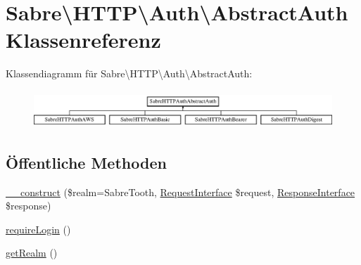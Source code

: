 \hypertarget{class_sabre_1_1_h_t_t_p_1_1_auth_1_1_abstract_auth}{}\section{Sabre\textbackslash{}H\+T\+TP\textbackslash{}Auth\textbackslash{}Abstract\+Auth Klassenreferenz}
\label{class_sabre_1_1_h_t_t_p_1_1_auth_1_1_abstract_auth}
Klassendiagramm für Sabre\textbackslash{}H\+T\+TP\textbackslash{}Auth\textbackslash{}Abstract\+Auth\+:\begin{figure}[H]
\begin{center}
\leavevmode
\includegraphics[height=1.428571cm]{class_sabre_1_1_h_t_t_p_1_1_auth_1_1_abstract_auth}
\end{center}
\end{figure}
\subsection*{Öffentliche Methoden}
\begin{DoxyCompactItemize}
\item 
\mbox{\hyperlink{class_sabre_1_1_h_t_t_p_1_1_auth_1_1_abstract_auth_a3e57c1181e92b05fb4061b17e00b19ad}{\+\_\+\+\_\+construct}} (\$realm=\textquotesingle{}Sabre\+Tooth\textquotesingle{}, \mbox{\hyperlink{interface_sabre_1_1_h_t_t_p_1_1_request_interface}{Request\+Interface}} \$request, \mbox{\hyperlink{interface_sabre_1_1_h_t_t_p_1_1_response_interface}{Response\+Interface}} \$response)
\item 
\mbox{\hyperlink{class_sabre_1_1_h_t_t_p_1_1_auth_1_1_abstract_auth_a05b82808b4e609f9539c9f717bcb09be}{require\+Login}} ()
\item 
\mbox{\hyperlink{class_sabre_1_1_h_t_t_p_1_1_auth_1_1_abstract_auth_ac2cae42eda3dfb5e4ddb18dec56e34d2}{get\+Realm}} ()
\end{DoxyCompactItemize}

